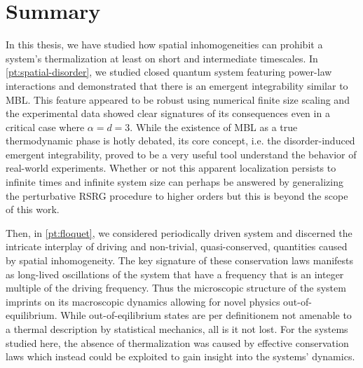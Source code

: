 \chapter*{Summary}
\label{pt:summary}
In this thesis, we have studied how spatial inhomogeneities can prohibit a system's thermalization at least on short and intermediate timescales. In \autoref{pt:spatial-disorder}, we studied closed quantum system featuring power-law interactions and demonstrated that there is an emergent integrability similar to MBL. This feature appeared to be robust using numerical finite size scaling and the experimental data showed clear signatures of its consequences even in a critical case where $\alpha=d=3$. While the existence of MBL as a true thermodynamic phase is hotly debated, its core concept, i.e. the disorder-induced emergent integrability, proved to be a very useful tool understand the behavior of real-world experiments. Whether or not this apparent localization persists to infinite times and infinite system size can perhaps be answered by generalizing the perturbative RSRG procedure to higher orders but this is beyond the scope of this work.

Then, in \autoref{pt:floquet}, we considered periodically driven system and discerned the intricate interplay of driving and non-trivial, quasi-conserved, quantities caused by spatial inhomogeneity. The key signature of these conservation laws manifests as long-lived oscillations of the system that have a frequency that is an integer multiple of the driving frequency. Thus the microscopic structure of the system imprints on its macroscopic dynamics allowing for novel physics out-of-equilibrium.
While out-of-eqilibrium states are per definitionem not amenable to a thermal description by statistical mechanics, all is it not lost. For the systems studied here, the absence of thermalization was caused by effective conservation laws which instead could be exploited to gain insight into the systems' dynamics.


%

